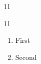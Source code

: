 \documentclass[paper=A4]{ropas-poster}
\begin{document}
\begin{postergrid}{1}{1}
\begin{posterblock}{1}{1}
\begin{enumerate}\item First\item Second\end{enumerate}
\end{posterblock}
\end{postergrid}
\end{document}
